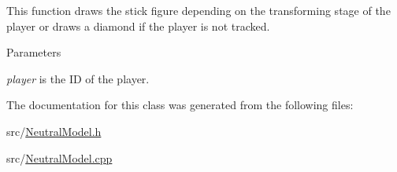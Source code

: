 This function draws the stick figure depending on the transforming stage of the player or draws a diamond if the player is not tracked.


\begin{DoxyParams}{Parameters}
\item[{\em player}]is the ID of the player. \end{DoxyParams}


The documentation for this class was generated from the following files:\begin{DoxyCompactItemize}
\item 
src/\hyperlink{NeutralModel_8h}{NeutralModel.h}\item 
src/\hyperlink{NeutralModel_8cpp}{NeutralModel.cpp}\end{DoxyCompactItemize}
